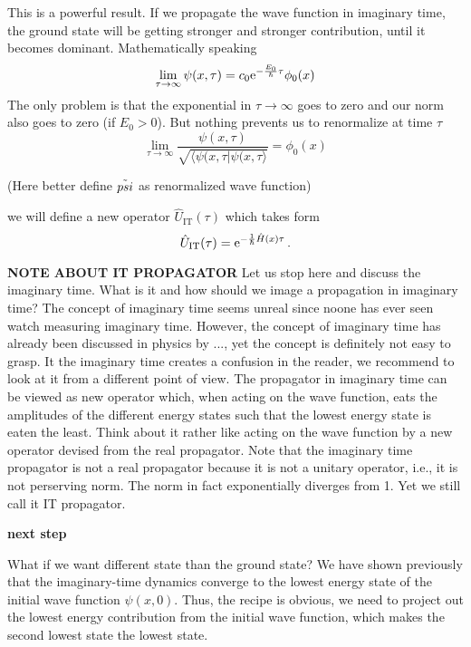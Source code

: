 This is a powerful result. If we propagate the wave function in imaginary time, the ground state will be getting stronger and stronger contribution, until it becomes dominant. Mathematically speaking
\begin{equation}
    \lim_{\tau\to\infty} \psi(x,\tau) = c_0 \mathrm{e}^{-\frac{E_0}{\hbar}\tau} \phi_0(x)
\end{equation}
The only problem is that the exponential in $\tau\to\infty$ goes to zero and our norm also goes to zero (if $E_0 > 0$). But nothing prevents us to renormalize at time $\tau$
\begin{equation}
    \lim_{\tau\to\infty} \frac{\psi(x,\tau)}{\sqrt{\langle\psi(x,\tau | \psi(x,\tau \rangle}} = \phi_0(x)
\end{equation}

(Here better define $\Tilde{psi}$ as renormalized wave function)

\vspace{2cm}
we will define a new operator $\hat{U}_\mathrm{IT}(\tau)$ which takes form
\begin{equation}
    \hat{U}_\mathrm{IT}(\tau) = \mathrm{e}^{-\frac{1}{\hbar}\hat{H}(x)\tau} \, .
\end{equation}


\textbf{NOTE ABOUT IT PROPAGATOR}
Let us stop here and discuss the imaginary time. What is it and how should we image a propagation in imaginary time? The concept of imaginary time seems unreal since noone has ever seen watch measuring imaginary time. However, the concept of imaginary time has already been discussed in physics by ..., yet the concept is definitely not easy to grasp. It the imaginary time creates a confusion in the reader, we recommend to look at it from a different point of view. The propagator in imaginary time can be viewed as new operator which, when acting on the wave function, eats the amplitudes of the different energy states such that the lowest energy state is eaten the least. Think about it rather like acting on the wave function by a new operator devised from the real propagator. Note that the imaginary time propagator is not a real propagator because it is not a unitary operator, i.e., it is not perserving norm. The norm in fact exponentially diverges from 1. Yet we still call it IT propagator.

\textbf{next step}

What if we want  different state than the ground state? We have shown previously that the imaginary-time dynamics  converge to the lowest energy state of the initial wave function $\psi(x,0)$.
Thus, the recipe is obvious, we need to project out the lowest energy contribution from the initial wave function, which makes the second lowest state the lowest state.

